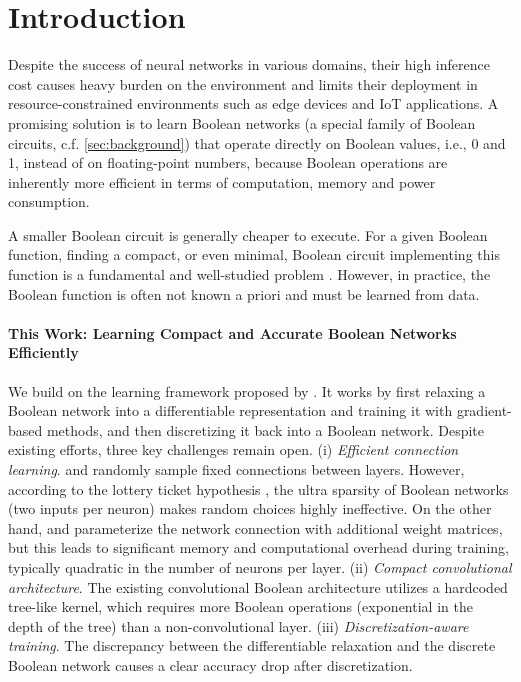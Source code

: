\section{Introduction}\label{sec:intro}

Despite the success of neural networks in various domains, their high inference cost
causes heavy burden on the environment and limits their deployment
in resource-constrained environments such as edge devices and IoT applications. 
A promising solution
is to learn Boolean networks (a special family of Boolean circuits, c.f. \cref{sec:background}) that operate directly on Boolean values, i.e., 0 and 1, instead of on floating-point numbers,
because 
Boolean operations are inherently more efficient in terms of computation, memory and power consumption.

A smaller Boolean circuit is generally cheaper to execute. 
For a given Boolean function, finding a compact,
or even minimal, Boolean circuit implementing this function is 
a fundamental and well-studied problem \citep{rudellMultipleValuedMinimizationPLA1987, ganai2000fly, micheli1994synthesis, bjesseDAGawareCircuitCompression2004,
 mishchenkoDAGawareAIGRewriting2006, rienerBooleanRewritingStrikes2022}. 
However, in practice, the Boolean function
is often not known a priori and must be learned from data. 

\paragraph{This Work: Learning Compact and Accurate Boolean Networks Efficiently}

We build on the learning framework proposed by \citet{petersen2022deep}. It works by
first relaxing a Boolean network into a differentiable representation and training it with gradient-based methods, 
and then discretizing it back into a Boolean network.
Despite existing efforts, three key challenges remain open. 
(i) \emph{Efficient connection learning}. 
\citet{petersen2022deep,petersen2024convolutional} and \citet{ruttgers2025light} randomly sample fixed connections between layers.
However, according to the lottery ticket hypothesis \citep{frankle2018the}, the ultra sparsity of Boolean networks (two inputs per neuron) makes random choices highly ineffective.
On the other hand, \citet{bacellar2024differentiable} and \citet{fojcik2025lilogic} 
parameterize the network connection with additional weight matrices, but this leads to significant memory and computational overhead during training, typically quadratic in the number of neurons per layer. 
(ii) \emph{Compact convolutional architecture}. The existing 
convolutional Boolean architecture \cite{petersen2024convolutional} utilizes 
a hardcoded tree-like kernel, which requires more Boolean operations (exponential in the depth of the tree) than a non-convolutional layer. 
(iii) \emph{Discretization-aware training}. The discrepancy between the differentiable relaxation and the discrete Boolean network causes
a clear accuracy drop after discretization.

